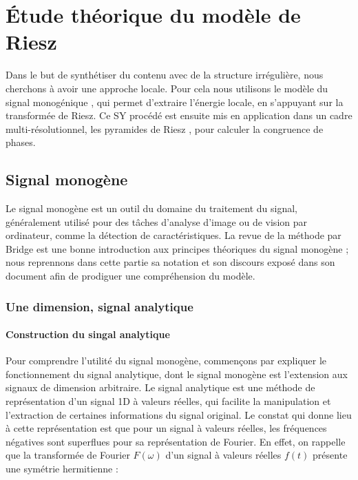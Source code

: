 \chapter[Modèle de Riesz]{Étude théorique du modèle de Riesz} %
\label{chap:chapitre3}

Dans le but de synthétiser du contenu avec de la structure irrégulière, nous cherchons à avoir une approche locale. Pour cela nous utilisons le modèle du signal monogénique \cite{felsberg_monogenic_2001}, qui permet d'extraire l'énergie locale, en s'appuyant sur la transformée de Riesz. Ce SY procédé est ensuite mis en application dans un cadre multi-résolutionnel, les pyramides de Riesz \cite{wadhwa_riesz_2014}, pour calculer la congruence de phases.

\section{Signal monogène}

Le signal monogène est un outil du domaine du traitement du signal, généralement utilisé pour des tâches d'analyse d'image ou de vision par ordinateur, comme la détection de caractéristiques. La revue de la méthode par Bridge \cite{bridge_introduction_2018} est une bonne introduction aux principes théoriques du signal monogène ; nous reprennons dans cette partie sa notation et son discours exposé dans son document afin de prodiguer une compréhension du modèle.

\subsection{Une dimension, signal analytique}

\subsubsection{Construction du singal analytique}

Pour comprendre l'utilité du signal monogène, commençons par expliquer le fonctionnement du signal analytique, dont le signal monogène est l'extension aux signaux de dimension arbitraire. Le signal analytique est une méthode de représentation d'un signal 1D à valeurs réelles, qui facilite la manipulation et l'extraction de certaines informations du signal original. Le constat qui donne lieu à cette représentation est que pour un signal à valeurs réelles, les fréquences négatives sont superflues pour sa représentation de Fourier. En effet, on rappelle que la transformée de Fourier $F(\omega)$ d'un signal à valeurs réelles $f(t)$ présente une symétrie hermitienne :


